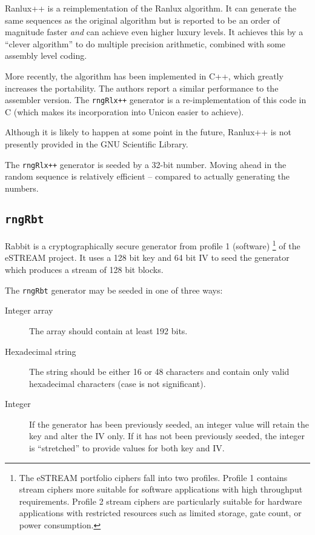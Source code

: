 \documentclass[letterpaper,12pt]{article}
\begin{document}
Ranlux++ is a reimplementation of the Ranlux algorithm\cite{Sibidanov:Ranlux++}.  It can
generate the same sequences as the original algorithm but is reported to be an order of
magnitude faster {\em and} can achieve even higher luxury levels. It achieves this by a
``clever algorithm'' to do multiple precision arithmetic, combined with some assembly
level coding.

More recently, the algorithm has been implemented in C++, which greatly increases the
portability. The authors\cite{Hahnfeld:Ranlux++} report a similar performance to the
assembler version.  The \texttt{rngRlx++} generator is a re-implementation of this code in
C (which makes its incorporation into Unicon easier to achieve).

Although it is likely to happen at some point in the future, Ranlux++ is not presently
provided in the GNU Scientific Library.

The \texttt{rngRlx++}  generator is seeded by a 32-bit number. Moving ahead in the random
sequence is relatively efficient -- compared to actually generating the numbers.

\subsection{\texttt{rngRbt}}
Rabbit is a cryptographically secure generator from profile 1 (software)%
\footnote{
  The eSTREAM portfolio ciphers fall into two profiles. Profile 1
  contains stream ciphers more suitable for software applications with high
  throughput requirements. Profile 2 stream ciphers are particularly
  suitable for hardware applications with restricted resources such as
  limited storage, gate count, or power consumption.
}
of the eSTREAM project\cite{eStream}. It uses a 128 bit key and 64 bit IV to
seed the generator which produces a stream of 128 bit blocks.

The \texttt{rngRbt} generator may be seeded in one of three ways:
\begin{description}
\item[Integer array] The array should contain at least 192 bits.
\item[Hexadecimal string] The string should be either 16 or 48 characters and contain only
  valid hexadecimal characters (case is not significant).
\item[Integer] If the generator has been previously seeded, an integer value will retain
  the key and alter the IV only. If it has not been previously seeded, the integer is
  ``stretched'' to provide values for both key and IV.
\end{description}
\end{document}
